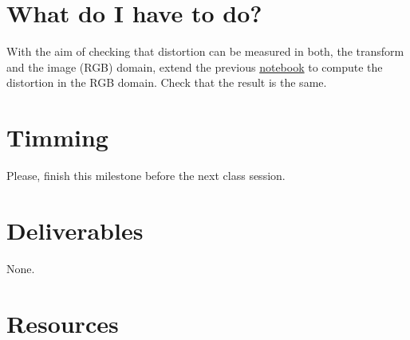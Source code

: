 \section{What do I have to do?}
With the aim of checking that distortion can be measured in both, the
transform and the image (RGB) domain, extend the
previous \href{https://github.com/Sistemas-s-Multimedia.github.io/blob/master/milestones/07-DCT/block_DCT_compression.ipynb}{notebook}
to compute the distortion in the RGB domain. Check that the result is
the same.

\section{Timming}

Please, finish this milestone before the next class session.

\section{Deliverables}

None.

\section{Resources}

\renewcommand{\addcontentsline}[3]{}%

